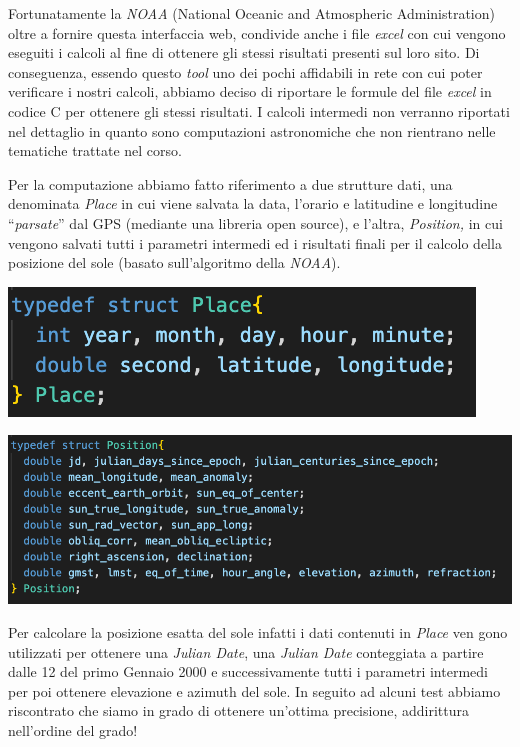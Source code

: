 Fortunatamente la \emph{NOAA} (National Oceanic and Atmospheric
Administration) oltre a fornire questa interfaccia web, condivide anche
i file \emph{excel} con cui vengono eseguiti i calcoli al fine di
ottenere gli stessi risultati presenti sul loro sito. Di conseguenza,
essendo questo \emph{tool} uno dei pochi affidabili in rete con cui
poter verificare i nostri calcoli, abbiamo deciso di riportare le
formule del file \emph{excel} in codice C per ottenere gli stessi
risultati. I calcoli intermedi non verranno riportati nel dettaglio in
quanto sono computazioni astronomiche che non rientrano nelle tematiche
trattate nel corso.

Per la computazione abbiamo fatto riferimento a due strutture dati, una
denominata \emph{Place} in cui viene salvata la data, l'orario e
latitudine e longitudine ``\emph{parsate}'' dal GPS (mediante una
libreria open source), e l'altra, \emph{Position,} in cui vengono
salvati tutti i parametri intermedi ed i risultati finali per il calcolo
della posizione del sole (basato sull'algoritmo della \emph{NOAA}).

\begin{center}
\includegraphics[scale=1]{figures/image25.png}
\captionsetup{type=figure}
\end{center}

\begin{center}
\includegraphics[scale=0.8]{figures/image33.png}
\captionsetup{type=figure}
\end{center}

Per calcolare la posizione esatta del sole infatti i dati contenuti in
\emph{Place} ven gono utilizzati per ottenere una \emph{Julian Date},
una \emph{Julian Date} conteggiata a partire dalle 12 del primo Gennaio
2000 e successivamente tutti i parametri intermedi per poi ottenere
elevazione e azimuth del sole. In seguito ad alcuni test abbiamo
riscontrato che siamo in grado di ottenere un'ottima precisione,
addirittura nell'ordine del grado!

